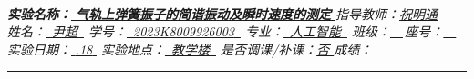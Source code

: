 \documentclass[UTF8]{article}
\theoremstyle{MyLineTheoremStyle} %
\theoremstyle{MyBlockTheoremStyle} %
\theoremstyle{MySubsubsectionStyle} %
\begin{document}


\begin{center}\large
    \\\vspace{0.4cm}
    \noindent\textit{
        \textbf{\bfseries 实验名称：}\uline{\hspace{0.8cm} \bfseries 气轨上弹簧振子的简谐振动及瞬时速度的测定 \hspace{0.8cm}}\hspace{0.4cm} 
        指导教师：\uline{\hspace{0.5cm}祝明通\hspace{0.5cm}}}
    \\\vspace{0.1cm}
    \noindent\textit{
        姓名：\uline{\,\,\,尹超\,\,\,}\hspace{0.2cm}
        学号：\uline{\,\,\,{\upshape 2023K8009926003}\,\,\,}\hspace{0.2cm}
        专业：\uline{\,\,\,人工智能\,\,\,}\hspace{0.2cm}
        班级：\uline{\,\,\,\,\,\,}\,座号：\uline{\,\,\,\,\,\,}}
    \\\vspace{0.1cm}
    \noindent\textit{
        实验日期：\uline{\,\,{.18}\,\,}\hspace{0.2cm}
        实验地点：\uline{\,\,\,教学楼{}\,\,\,}\hspace{0.2cm}
        是否调课/补课：\uline{\hspace{0.26cm}否 \hspace{0.26cm}}\hspace{0.2cm}
        成绩：\uline{\hspace{2cm}}}
\end{center}
\noindent\rule{\textwidth}{0.1em}   %


\setcounter{tocdepth}{2}  %
\noindent\tableofcontents\thispagestyle{fancy}   %
\end{document}
